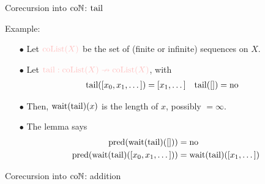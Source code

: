 \begin{frame}{Corecursion into $\mathrm{co}\mathbb{N}$: $\operatorname{tail}$} %
  
  \par Example:
  \begin{itemize}
    \item[$\bullet$] {
      Let $\textcolor{pink}{\coList(X)}$ be the set of (finite or infinite) sequences on $X$.
    }\pause
    \item[$\bullet$] {
      Let $\textcolor{pink}{\tail : \coList(X) \nto \coList(X)}$, with
      \begin{align*}
        \operatorname{tail}([x_0, x_1, \dots]) &= [x_1, \dots]
        &\operatorname{tail}([]) &= \mathrm{no}
      \end{align*}
    }\pause
    \item[$\bullet$] {
      Then, $\operatorname{wait}(\operatorname{tail})(x)$ is the length of $x$, possibly $= \infty$.
    }\pause
    \item[$\bullet$] {
      The lemma says
      \begin{align*}
        \operatorname{pred}(\operatorname{wait}(\operatorname{tail})([])) &= \mathrm{no} \\
        \operatorname{pred}(\operatorname{wait}(\operatorname{tail})([x_0, x_1, \dots])) &= \operatorname{wait}(\operatorname{tail})([x_1, \dots])
      \end{align*}
    }
  \end{itemize}

\end{frame}

\begin{frame}{Corecursion into $\mathrm{co}\mathbb{N}$: addition} %
  
  \par 

\end{frame}

